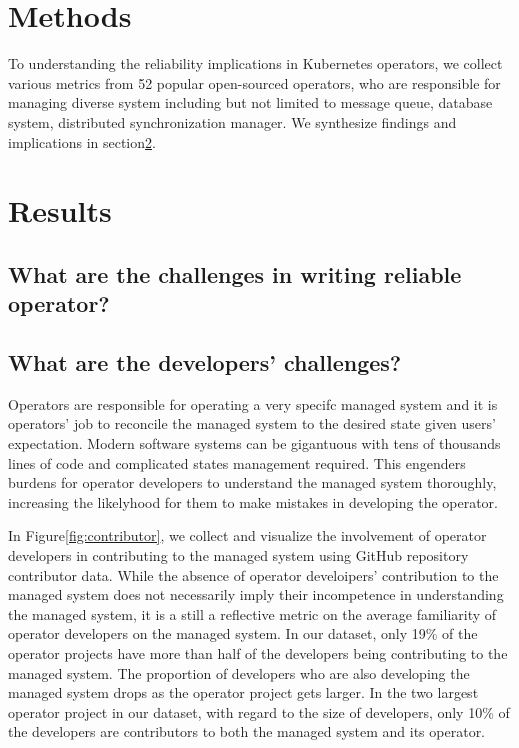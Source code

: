 \section{Methods}
To understanding the reliability implications in Kubernetes operators, we collect various metrics from 52 
    popular open-sourced operators, who are responsible for managing diverse system including but not limited to
    message queue, database system, distributed synchronization manager.
We synthesize findings and implications in section\ref{sec:result}.

\section{Results}
\label{sec:result}
\subsection{What are the challenges in writing reliable operator?}
\subsection{What are the developers' challenges?}
Operators are responsible for operating a very specifc managed system and it is operators' job to reconcile 
    the managed system to the desired state given users' expectation.
Modern software systems can be gigantuous with tens of thousands lines of code and complicated states management required.
This engenders burdens for operator developers to understand the managed system thoroughly, increasing the likelyhood for them to
    make mistakes in developing the operator.

In Figure\ref{fig:contributor}, we collect and visualize the involvement of operator developers in contributing to the managed system 
    using GitHub repository contributor data.
While the absence of operator develoipers' contribution to the managed system does not necessarily imply their incompetence in understanding 
    the managed system, it is a still a reflective metric on the average familiarity of operator developers on the managed system.
In our dataset, only 19\% of the operator projects have more than half of the developers being contributing to the managed system.
The proportion of developers who are also developing the managed system drops as the operator project gets larger.
In the two largest operator project in our dataset, with regard to the size of developers, only 10\% of the developers are contributors to
    both the managed system and its operator.


